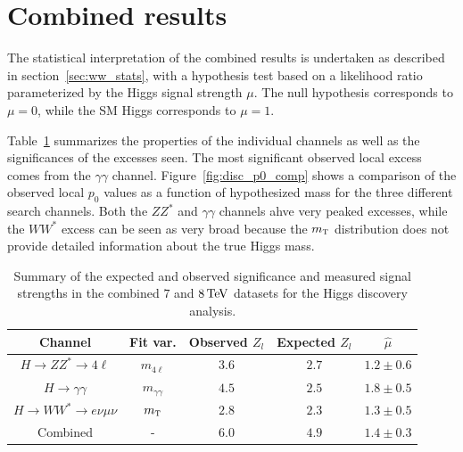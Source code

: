 \section{Combined results}

The statistical interpretation of the combined results is undertaken as described in section~\ref{sec:ww_stats}, with a hypothesis test based on a likelihood ratio parameterized by the Higgs signal strength $\mu$. The null hypothesis corresponds to $\mu = 0$, while the SM Higgs corresponds to $\mu = 1$. 

Table~\ref{tab:discovery_summary} summarizes the properties of the individual channels as well as the significances of the excesses seen. The most significant observed local excess comes from the $\gamma\gamma$ channel. Figure~\ref{fig:disc_p0_comp} shows a comparison of the observed local $p_0$ values as a function of hypothesized mass for the three different search channels. Both the $ZZ^*$ and $\gamma\gamma$ channels ahve very peaked excesses, while the $WW^*$ excess can be seen as very broad because the $m_{\textrm{\footnotesize\sc t}}$ distribution does not provide detailed information about the true Higgs mass. 

\begin{table}[h!]
\centering
\captionsetup{justification=centering}

\hspace{-10pt}
\begin{tabular}{|c|c|c|c|c|}
\hline
Channel & Fit var. & Observed $Z_l$ & Expected $Z_l$ & $\hat{\mu}$ \\ \hline
$H\to ZZ^* \to 4\ell$ & $m_{4\ell}$ & $3.6$ & $2.7$ & $1.2 \pm 0.6$ \\ \hline
$H\to\gamma\gamma$ & $m_{\gamma\gamma}$ & $4.5$ & $2.5$ & $1.8 \pm 0.5$ \\ \hline
$H\to WW^* \to e\nu\mu\nu$ & $m_{\textrm{\footnotesize\sc t}}$ & $2.8$ & $2.3$ & $1.3 \pm 0.5$ \\ \hline
Combined & - & $6.0$ & $4.9$ & $1.4 \pm 0.3$ \\ \hline
\end{tabular}

\caption{
Summary of the expected and observed significance and measured signal strengths in the combined $7$ and $8 \TeV$ datasets for the Higgs discovery analysis\cite{Discovery}. 
}
\label{tab:discovery_summary}
\end{table}

